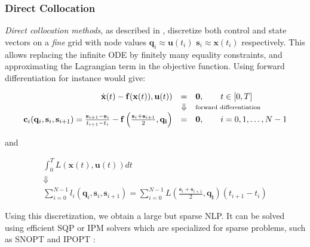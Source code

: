 \subsubsection{Direct Collocation}

\emph{Direct collocation methods}, as described in
\cite{tsang1975optimal}, discretize both control and state vectors on
a \emph{fine} grid with node values
$\mathbf{q}_i\approx\mathbf{u}(t_i)$
$\mathbf{s}_i\approx\mathbf{x}(t_i)$ respectively. This allows
replacing the infinite ODE by finitely many equality constraints, and
approximating the Lagrangian term in the objective function. Using
forward differentiation for instance would give:

\begin{equation}
  \begin{array}{rcl}
    \dot{\mathbf{x}}(t) -
    \mathbf{f}(\mathbf{x}(t)),\mathbf{u}(t)) & = & \mathbf{0}, \qquad t\in[0,T] \\
    & \Downarrow  & \text{\scriptsize forward differentiation}\\
    \mathbf{c}_i(\mathbf{q}_i,\mathbf{s}_i,\mathbf{s}_{i+1}) =
    \frac{\mathbf{s}_{i+1}-\mathbf{s}_i}{t_{i+1}-t_i} -
    \mathbf{f}\left(\frac{\mathbf{s}_{i}+\mathbf{s}_{i+1}}{2},
    \mathbf{q_i}\right) & = & \mathbf{0}, \qquad i=0,1,\ldots,N-1
  \end{array}
\end{equation}

and

\begin{equation}
  \begin{array}{c}
    \int_{0}^{T}L (\mathbf{x}(t), \mathbf{u}(t))dt \\ 
    \Downarrow \\
    \sum_{i=0}^{N-1}l_i(\mathbf{q}_i,\mathbf{s}_i,\mathbf{s}_{i+1})=\sum_{i=0}^{N-1}L\left(\frac{\mathbf{s}_{i}+\mathbf{s}_{i+1}}{2},
    \mathbf{q_i}\right)(t_{i+1}-t_i)
  \end{array}
\end{equation}

Using this discretization, we obtain a large but sparse NLP. It can be
solved using efficient SQP or IPM solvers which are specialized for
sparse problems, such as \textsc{SNOPT} \cite{gill2002snopt} and \textsc{IPOPT}
\cite{Biegler2009}:

